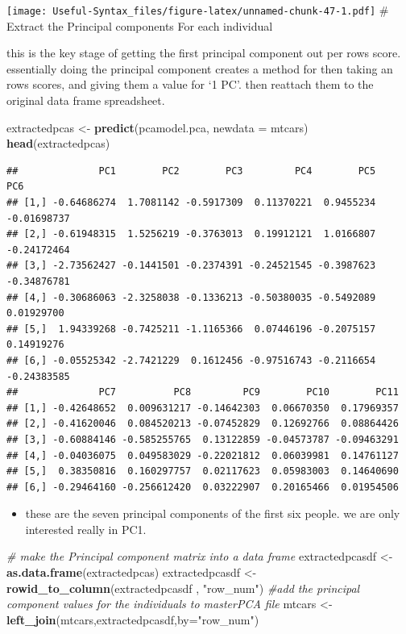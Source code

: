\documentclass[
]{article}
\newenvironment{Shaded}{\begin{snugshade}}{\end{snugshade}}
\newcommand{\AttributeTok}[1]{\textcolor[rgb]{0.13,0.29,0.53}{#1}}
\newcommand{\CommentTok}[1]{\textcolor[rgb]{0.56,0.35,0.01}{\textit{#1}}}
\newcommand{\FunctionTok}[1]{\textcolor[rgb]{0.13,0.29,0.53}{\textbf{#1}}}
\newcommand{\NormalTok}[1]{#1}
\newcommand{\OtherTok}[1]{\textcolor[rgb]{0.56,0.35,0.01}{#1}}
\newcommand{\StringTok}[1]{\textcolor[rgb]{0.31,0.60,0.02}{#1}}
\providecommand{\tightlist}{%
  \setlength{\itemsep}{0pt}\setlength{\parskip}{0pt}}
\begin{document}
\texttt{[image: Useful-Syntax\_files/figure-latex/unnamed-chunk-47-1.pdf]}
\# Extract the Principal components For each individual

this is the key stage of getting the first principal component out per rows score. essentially doing the principal component creates a method for then taking an rows scores, and giving them a value for `1 PC'. then reattach them to the original data frame spreadsheet.

\begin{Shaded}
\begin{Highlighting}[]
\NormalTok{extractedpcas }\OtherTok{\textless{}{-}} \FunctionTok{predict}\NormalTok{(pcamodel.pca, }\AttributeTok{newdata =}\NormalTok{ mtcars)}
\FunctionTok{head}\NormalTok{(extractedpcas)}
\end{Highlighting}
\end{Shaded}

\begin{verbatim}
##              PC1        PC2        PC3         PC4        PC5         PC6
## [1,] -0.64686274  1.7081142 -0.5917309  0.11370221  0.9455234 -0.01698737
## [2,] -0.61948315  1.5256219 -0.3763013  0.19912121  1.0166807 -0.24172464
## [3,] -2.73562427 -0.1441501 -0.2374391 -0.24521545 -0.3987623 -0.34876781
## [4,] -0.30686063 -2.3258038 -0.1336213 -0.50380035 -0.5492089  0.01929700
## [5,]  1.94339268 -0.7425211 -1.1165366  0.07446196 -0.2075157  0.14919276
## [6,] -0.05525342 -2.7421229  0.1612456 -0.97516743 -0.2116654 -0.24383585
##              PC7          PC8         PC9        PC10        PC11
## [1,] -0.42648652  0.009631217 -0.14642303  0.06670350  0.17969357
## [2,] -0.41620046  0.084520213 -0.07452829  0.12692766  0.08864426
## [3,] -0.60884146 -0.585255765  0.13122859 -0.04573787 -0.09463291
## [4,] -0.04036075  0.049583029 -0.22021812  0.06039981  0.14761127
## [5,]  0.38350816  0.160297757  0.02117623  0.05983003  0.14640690
## [6,] -0.29464160 -0.256612420  0.03222907  0.20165466  0.01954506
\end{verbatim}

\begin{itemize}
\tightlist
\item
  these are the seven principal components of the first six people. we are only interested really in PC1.
\end{itemize}

\begin{Shaded}
\begin{Highlighting}[]
\CommentTok{\# make the Principal component matrix into a data frame }
\NormalTok{extractedpcasdf }\OtherTok{\textless{}{-}} \FunctionTok{as.data.frame}\NormalTok{(extractedpcas)}
\NormalTok{extractedpcasdf }\OtherTok{\textless{}{-}} \FunctionTok{rowid\_to\_column}\NormalTok{(extractedpcasdf , }\StringTok{"row\_num"}\NormalTok{)}
\CommentTok{\#add the principal component values for the individuals to masterPCA file}
\NormalTok{mtcars }\OtherTok{\textless{}{-}} \FunctionTok{left\_join}\NormalTok{(mtcars,extractedpcasdf,}\AttributeTok{by=}\StringTok{"row\_num"}\NormalTok{)}
\end{Highlighting}
\end{Shaded}
\end{document}
